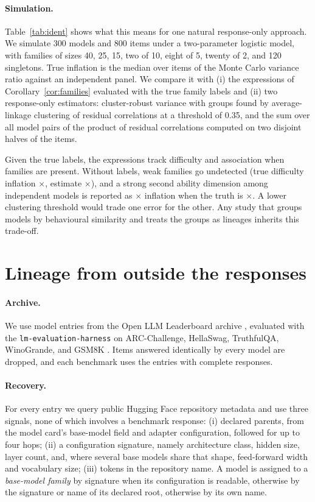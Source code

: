 \documentclass[10pt]{article}
\theoremstyle{remark}\newtheorem{remark}{Remark}
\begin{document}
\paragraph{Simulation.}
Table~\ref{tab:ident} shows what this means for one natural response-only
approach. We simulate 300 models and 800 items under a two-parameter logistic
model, with families of sizes 40, 25, 15, two of 10, eight of 5, twenty of 2,
and 120 singletons. True inflation is the median over items of the Monte Carlo
variance ratio against an independent panel. We compare it with (i) the
expressions of Corollary~\ref{cor:families} evaluated with the true family
labels and (ii) two response-only estimators: cluster-robust variance with
groups found by average-linkage clustering of residual correlations at a
threshold of 0.35, and the sum over all model pairs of the product of residual
correlations computed on two disjoint halves of the items.

Given the true labels, the expressions track difficulty and association when
families are present. Without labels, weak families go undetected (true
difficulty inflation \IdentMissTruth$\times$, estimate
\IdentMissEst$\times$), and a strong second ability dimension among
independent models is reported as \IdentFalseEst$\times$ inflation when the
truth is \IdentFalseTruth$\times$. A lower clustering threshold would trade
one error for the other. Any study that groups models by behavioural
similarity and treats the groups as lineages inherits this trade-off.

\section{Lineage from outside the responses}\label{sec:lineage}
\paragraph{Archive.} We use \NModels{} model entries from the Open LLM
Leaderboard archive \citep{openllmleaderboard}, evaluated with the
\texttt{lm-evaluation-harness} \citep{eval-harness} on ARC-Challenge,
HellaSwag, TruthfulQA, WinoGrande, and GSM8K
\citep{clark2018arc,zellers2019hellaswag,lin2022truthfulqa,sakaguchi2021winogrande,cobbe2021gsm8k}.
Items answered identically by every model are dropped, and each benchmark uses
the entries with complete responses.

\paragraph{Recovery.} For every entry we query public Hugging Face repository
metadata and use three signals, none of which involves a benchmark response:
(i) declared parents, from the model card's base-model field and adapter
configuration, followed for up to four hops; (ii) a configuration signature,
namely architecture class, hidden size, layer count, and, where several base
models share that shape, feed-forward width and vocabulary size;
(iii) tokens in the repository name. A model is assigned to a
\emph{base-model family} by signature when its configuration is readable,
otherwise by the signature or name of its declared root, otherwise by its own
name.

\end{document}
